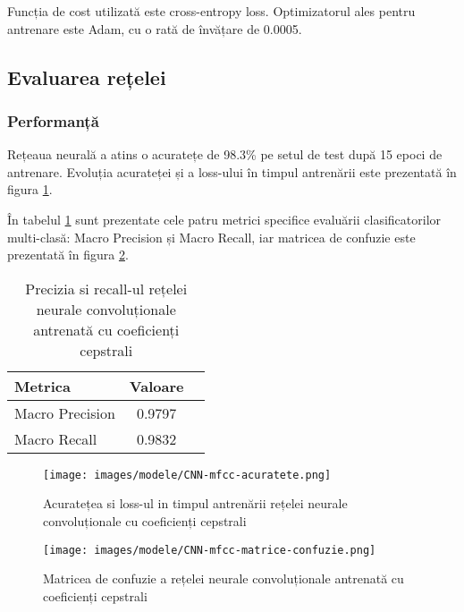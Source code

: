 Funcția de cost utilizată este cross-entropy loss. Optimizatorul ales pentru antrenare este Adam, cu o rată de învățare de 0.0005.


\subsection{Evaluarea rețelei}

\subsubsection{Performanță}

Rețeaua neurală a atins o acuratețe de 98.3\% pe setul de test după 15 epoci de antrenare. Evoluția acurateței și a loss-ului în timpul antrenării este prezentată în figura \ref{fig:acuratete_CNN_mfcc}. 

În tabelul \ref{tab:precizie_recall_CNN_mfcc} sunt prezentate cele patru metrici specifice evaluării clasificatorilor multi-clasă: Macro Precision și Macro Recall, iar matricea de confuzie este prezentată în figura \ref{fig:matriceConfuzie_CNN_mfcc}.

\begin{table}[h]
    \centering
    \begin{tabular}{lcc}
        \toprule
        \textbf{Metrica} & \textbf{Valoare} \\
        \midrule
        Macro Precision & 0.9797 \\
        Macro Recall    & 0.9832 \\
        \bottomrule
    \end{tabular}
    \caption{Precizia si recall-ul rețelei neurale convoluționale antrenată cu coeficienți cepstrali}
    \label{tab:precizie_recall_CNN_mfcc}
\end{table}

\begin{figure}
    \centering
    \texttt{[image: images/modele/CNN-mfcc-acuratete.png]}
    \caption{Acuratețea si loss-ul in timpul antrenării rețelei neurale convoluționale cu coeficienți cepstrali}
    \label{fig:acuratete_CNN_mfcc}
\end{figure}

\begin{figure}
    \centering
    \texttt{[image: images/modele/CNN-mfcc-matrice-confuzie.png]}
    \caption{Matricea de confuzie a rețelei neurale convoluționale antrenată cu coeficienți cepstrali}
    \label{fig:matriceConfuzie_CNN_mfcc}
\end{figure}


